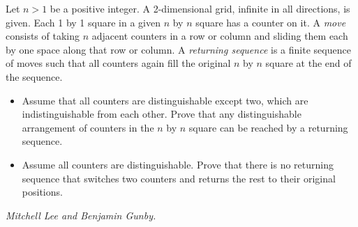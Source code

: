 Let $n > 1$ be a positive integer. A 2-dimensional grid, infinite in all directions, is given. Each 1 by 1 square in a given $n$ by $n$ square has a counter on it. A \textit{move} consists of taking $n$ adjacent counters in a row or column and sliding them each by one space along that row or column. A \textit{returning sequence} is a finite sequence of moves such that all counters again fill the original $n$ by $n$ square at the end of the sequence.
\begin{itemize}
	\item Assume that all counters are distinguishable except two, which are indistinguishable from each other. Prove that any distinguishable arrangement of counters in the $n$ by $n$ square can be reached by a returning sequence.
	\item Assume all counters are distinguishable. Prove that there is no returning sequence that switches two counters and returns the rest to their original positions.
\end{itemize}

\textit{Mitchell Lee and Benjamin Gunby.}